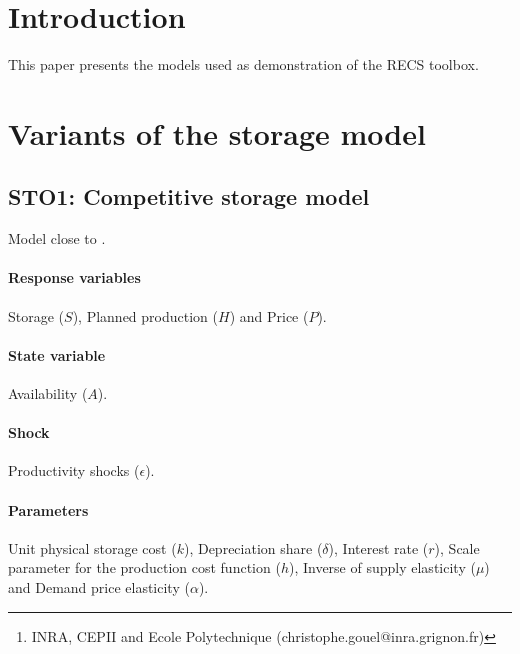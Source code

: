 \documentclass[11pt,fleqn]{article}
\title{}
\date{\today}%
\author{Christophe Gouel\footnote{INRA, CEPII and Ecole Polytechnique
    (christophe.gouel@inra.grignon.fr)}}
\begin{document}
\maketitle

\tableofcontents

\section{Introduction}
\label{sec:introduction}

This paper presents the models used as demonstration of the RECS toolbox.

\section{Variants of the storage model}
\label{sec:vari-stor-model}

\subsection{STO1: Competitive storage model}
\label{sec:comp-stor-model}

Model close to \citet{Wrig82}.

\paragraph{Response variables}
\label{sec:response-variables}

Storage ($S$), Planned production ($H$) and Price ($P$).

\paragraph{State variable}
\label{sec:state-variable}

Availability ($A$).

\paragraph{Shock}
\label{sec:shock}

Productivity shocks ($\epsilon$).

\paragraph{Parameters}
\label{sec:parameters}

Unit physical storage cost ($k$), Depreciation share ($\delta$), Interest rate
($r$), Scale parameter for the production cost function ($h$), Inverse of supply
elasticity ($\mu$) and Demand price elasticity ($\alpha$).
\end{document}
